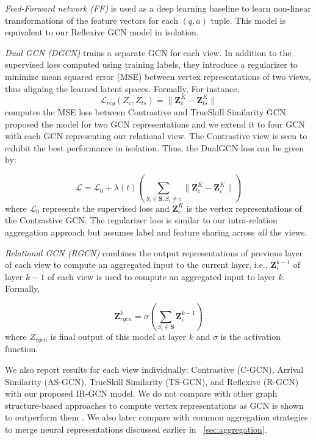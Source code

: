 \noindent
\textit{Feed-Forward network (FF)} \cite{JendersKN16} is used as a deep learning baseline to learn non-linear transformations of the feature vectors for each $(q, a)$ tuple. This model is equivalent to our Reflexive GCN model in isolation.

\noindent
\textit{Dual GCN (DGCN)} \cite{DualGCN} trains a separate GCN for each view. In addition to the supervised loss computed using training labels, they introduce a regularizer to minimize mean squared error (MSE) between vertex representations of two views, thus aligning the learned latent spaces.
Formally,
For instance,
\begin{equation}
 \mathcal L_{reg}(Z_c, Z_{ts}) = \lVert \mathbf{Z}_c^K - \mathbf{Z}_{ts}^K \lVert
\end{equation}
computes the MSE loss between Contrastive and TrueSkill Similarity GCN.
\citet{DualGCN} proposed the model for two GCN representations and we extend it to four GCN with each GCN representing our relational view.
The Contrastive view is seen to exhibit the best performance in isolation. Thus, the DualGCN loss can be given by:

\begin{equation}
  \mathcal L  = \mathcal L_0 +  \lambda{(t)} \left( \sum_{S_i \in \mathbf{S}, S_i \neq c} \lVert \mathbf{Z}_c^K - \mathbf{Z}_i^K \lVert \right)
\end{equation}
where $\mathcal L_0$ represents the supervised loss and $\mathbf{Z}_c^K$ is the vertex representations of the Contrastive GCN.
The regularizer loss is similar to our intra-relation aggregation approach but assumes label and feature sharing across \emph{all} the views.

\noindent
\textit{Relational GCN (RGCN)} \cite{relationalGCN} combines the output representations of previous layer of each view to compute an aggregated input to the current layer, i.e.,
$\mathbf{Z}_i^{k-1}$ of layer $k-1$ of each view is used to compute an aggregated input to layer $k$.
Formally,

\begin{equation}
  \mathbf{Z}_{rgcn}^{k} = \sigma \left( \sum_{S_i \in \mathbf{S}} \mathbf{Z}_i^{k-1}\right)
\end{equation}
where $Z_{rgcn}$ is final output of this model at layer $k$ and $\sigma$ is the activation function.

We also report results for each view individually: Contrastive (C-GCN), Arrival Similarity (AS-GCN), TrueSkill Similarity (TS-GCN), and Reflexive (R-GCN) with our proposed IR-GCN model. We do not compare with other graph structure-based approaches to compute vertex representations \cite{DeepWalk, node2vec, Planetoid, LINE} as GCN is shown to outperform them \cite{gcn}. We also later compare with common aggregation strategies to merge neural representations discussed earlier in ~\cref{sec:aggregation}.

